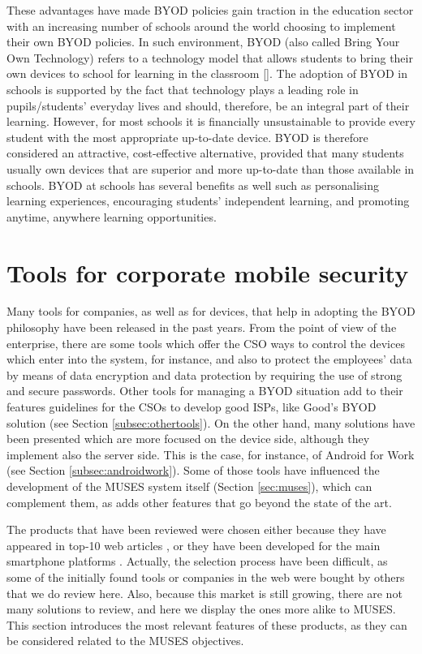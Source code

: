 These advantages have made BYOD policies gain traction in the education sector with an increasing number of schools around the world choosing to implement their own BYOD policies. In such environment, BYOD (also called Bring Your Own Technology) refers to a technology model that allows students to bring their own devices to school for learning in the classroom [\cite{sangani2013byod, song2014bring}]. The adoption of BYOD in schools is supported by the fact that technology plays a leading role in
pupils/students' everyday lives and should, therefore, be an integral part of their learning. However, for most schools it is financially unsustainable to provide every student with the most appropriate up-to-date device. BYOD is therefore considered an attractive, cost-effective alternative, provided that many students usually own
devices that are superior and more up-to-date than those available in schools. BYOD at schools has several benefits as well such as personalising learning experiences, encouraging students' independent learning, and promoting anytime, anywhere learning opportunities.

\section{Tools for corporate mobile security}
\label{sec:toolsreview}

Many tools for companies, as well as for devices, that help in adopting the BYOD philosophy have been released in the past years. From the point of view of the enterprise, there are some tools which offer the CSO ways to control the devices which enter into the system, for instance, and also to protect the employees' data by means of data encryption and data protection by requiring the use of strong and secure passwords. Other tools for managing a BYOD situation add to their features guidelines for the CSOs to develop good ISPs, like Good's BYOD solution (see Section \ref{subsec:othertools}). On the other hand, many solutions have been presented which are more focused on the device side, although they implement also the server side. This is the case, for instance, of Android for Work (see Section \ref{subsec:androidwork}). Some of those tools have influenced the development of the MUSES system  itself (Section \ref{sec:muses}), which can complement them, as adds other features that go beyond the state of the art. 

The products that have been reviewed were chosen either because they have appeared in top-10 web articles \cite{thor2013}, or they have been developed for the main smartphone platforms \cite{idc2014}. Actually, the selection process have been difficult, as some of the initially found tools or companies in the web were bought by others that we do review here. Also, because this market is still growing, there are not many solutions to review, and here we display the ones more alike to MUSES. This section introduces the most relevant features of these products, as they can be considered related to the MUSES objectives.

